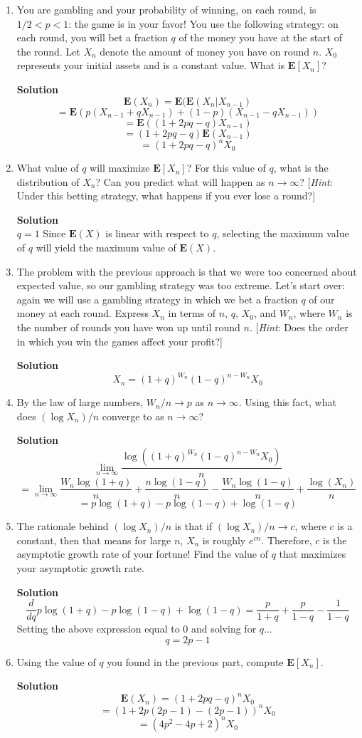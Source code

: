 \documentclass[11pt]{article}
\newenvironment{Parts}{\begin{enumerate}[label=(\alph*)]}{\end{enumerate}}
\newcommand*{\Part}{\item}
\newenvironment{Answer}{\vspace{10pt}\begin{mdframed}\textbf{Solution}\\}{\end{mdframed}\vfill\pagebreak[3]}
\newenvironment{Answer}{\vspace{10pt}}{\vfill\pagebreak[3]}
\newcommand*{\E}{\textbf{E}}
\begin{document}
\begin{Parts}    
  \Part You are gambling and your probability of winning, on each round, is $1/2 < p < 1$: the game is in your favor! You use the following strategy: on each round, you will bet a fraction $q$ of the money you have at the start of the round. Let $X_n$ denote the amount of money you have on round $n$. $X_0$ represents your initial assets and is a constant value. What is $\E[X_n]$?
  \begin{Answer}
    $$\E(X_n)=\E(\E(X_n|X_{n-1})$$
    $$=\E(p(X_{n-1}+qX_{n-1})+(1-p)(X_{n-1}-qX_{n-1}))$$
    $$=\E((1+2pq-q)X_{n-1})$$
    $$=(1+2pq-q)\E(X_{n-1})$$
    $$=(1+2pq-q)^{n}X_0$$
  \end{Answer}
  
  \Part What value of $q$ will maximize $\E[X_n]$? For this value of $q$, what is the distribution of $X_n$? Can you predict what will happen as $n \to \infty$? [\textit{Hint}: Under this betting strategy, what happens if you ever lose a round?]
  \begin{Answer}
    $q=1$ Since $\E(X)$ is linear with respect to $q$, selecting the maximum value of $q$ will yield the maximum value of $\E(X)$.
  \end{Answer}
  
  \Part The problem with the previous approach is that we were too concerned about expected value, so our gambling strategy was too extreme. Let's start over: again we will use a gambling strategy in which we bet a fraction $q$ of our money at each round. Express $X_n$ in terms of $n$, $q$, $X_0$, and $W_n$, where $W_n$ is the number of rounds you have won up until round $n$. [\textit{Hint}: Does the order in which you win the games affect your profit?]
  \begin{Answer}
    $$X_n=(1+q)^{W_n}(1-q)^{n-W_n}X_0$$
  \end{Answer}
  
  \Part By the law of large numbers, $W_n/n \to p$ as $n \to \infty$. Using this fact, what does $(\log X_n)/n$ converge to as $n \to \infty$?
  \begin{Answer}
    $$\lim_{n\to\infty} \frac{\log((1+q)^{W_n}(1-q)^{n-W_n}X_0)}{n}$$
    $$=\lim_{n\to\infty}\frac{W_n\log(1+q)}{n}+\frac{n\log(1-q)}{n}-\frac{W_n\log(1-q)}{n}+\frac{\log(X_n)}{n}$$
    $$=p\log(1+q)-p\log(1-q)+\log(1-q)$$
  \end{Answer}
  
  \Part The rationale behind $(\log X_n)/n$ is that if $(\log X_n)/n \to c$, where $c$ is a constant, then that means for large $n$, $X_n$ is roughly $e^{cn}$. Therefore, $c$ is the asymptotic growth rate of your fortune! Find the value of $q$ that maximizes your asymptotic growth rate.
  \begin{Answer}
    $$\frac{d}{dq}p\log(1+q)-p\log(1-q)+\log(1-q)=\frac{p}{1+q}+\frac{p}{1-q}-\frac{1}{1-q}$$
    Setting the above expression equal to 0 and solving for $q$...
    $$q=2p-1$$
  \end{Answer}
  
  \Part Using the value of $q$ you found in the previous part, compute $\E[X_n]$.
  \begin{Answer}
    $$\E(X_n)=(1+2pq-q)^{n}X_0$$
    $$=(1+2p(2p-1)-(2p-1))^{n}X_0$$
    $$=(4p^2-4p+2)^{n}X_0$$
  \end{Answer}
\end{Parts}
\end{document}
